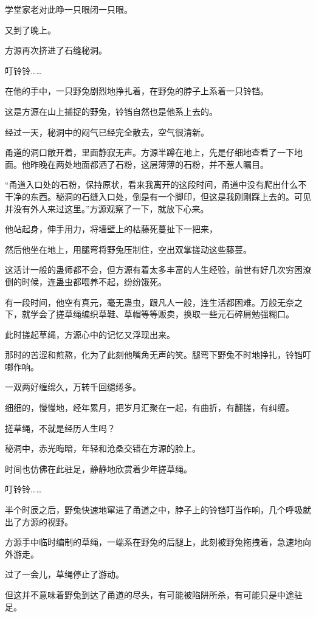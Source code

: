 \begin{this_body}
学堂家老对此睁一只眼闭一只眼。

又到了晚上。

方源再次挤进了石缝秘洞。

叮铃铃……

在他的手中，一只野兔剧烈地挣扎着，在野兔的脖子上系着一只铃铛。

这是方源在山上捕捉的野兔，铃铛自然也是他系上去的。

经过一天，秘洞中的闷气已经完全散去，空气很清新。

甬道的洞口敞开着，里面静寂无声。方源半蹲在地上，先是仔细地查看了一下地面。他昨晚在两处地面都洒了石粉，这层薄薄的石粉，并不惹人瞩目。

“甬道入口处的石粉，保持原状，看来我离开的这段时间，甬道中没有爬出什么不干净的东西。秘洞的石缝入口处，倒是有一个脚印，但这是我刚刚踩上去的。可见并没有外人来过这里。”方源观察了一下，就放下心来。

他站起身，伸手用力，将墙壁上的枯藤死蔓扯下一把来，

然后他坐在地上，用腿弯将野兔压制住，空出双掌搓动这些藤蔓。

这活计一般的蛊师都不会，但方源有着太多丰富的人生经验，前世有好几次穷困潦倒的时候，连蛊虫都喂养不起，纷纷饿死。

有一段时间，他空有真元，毫无蛊虫，跟凡人一般，连生活都困难。万般无奈之下，就学会了搓草绳编织草鞋、草帽等等贩卖，换取一些元石碎屑勉强糊口。

此时搓起草绳，方源心中的记忆又浮现出来。

那时的苦涩和煎熬，化为了此刻他嘴角无声的笑。腿弯下野兔不时地挣扎，铃铛叮啷作响。

一双两好缠绵久，万转千回缱绻多。

细细的，慢慢地，经年累月，把岁月汇聚在一起，有曲折，有翻搓，有纠缠。

搓草绳，不就是经历人生吗？

秘洞中，赤光晦暗，年轻和沧桑交错在方源的脸上。

时间也仿佛在此驻足，静静地欣赏着少年搓草绳。

叮铃铃……

半个时辰之后，野兔快速地窜进了甬道之中，脖子上的铃铛叮当作响，几个呼吸就出了方源的视野。

方源手中临时编制的草绳，一端系在野兔的后腿上，此刻被野兔拖拽着，急速地向外游走。

过了一会儿，草绳停止了游动。

但这并不意味着野兔到达了甬道的尽头，有可能被陷阱所杀，有可能只是中途驻足。


\end{this_body}
